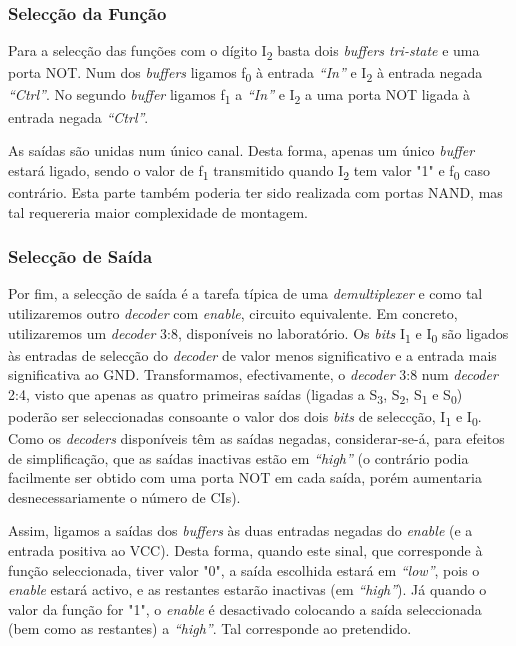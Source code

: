 \documentclass[a4paper,12pt]{article}
\begin{document}
\subsubsection{Selecção da Função}
Para a selecção das funções com o dígito I\textsubscript{2} basta dois {\it buffers tri-state} e uma porta NOT. Num dos {\it buffers} ligamos f\textsubscript{0} à entrada {\it ``In''} e I\textsubscript{2} à entrada negada {\it ``Ctrl''}. No segundo {\it buffer} ligamos f\textsubscript{1} a {\it ``In''} e I\textsubscript{2} a uma porta NOT ligada à entrada negada {\it ``Ctrl''}. 
\par
As saídas são unidas num único canal. Desta forma, apenas um único {\it buffer} estará ligado, sendo o valor de f\textsubscript{1} transmitido quando I\textsubscript{2} tem valor "1" e f\textsubscript{0} caso contrário. Esta parte também poderia ter sido realizada com portas NAND, mas tal requereria maior complexidade de montagem.
\par
\subsubsection{Selecção de Saída}
Por fim, a selecção de saída é a tarefa típica de uma {\it demultiplexer} e como tal utilizaremos outro {\it decoder} com {\it enable}, circuito equivalente. Em concreto, utilizaremos um {\it decoder} 3:8, disponíveis no laboratório. Os {\it bits} I\textsubscript{1} e I\textsubscript{0} são ligados às entradas de selecção do {\it decoder} de valor menos significativo e a entrada mais significativa ao GND. Transformamos, efectivamente, o {\it decoder} 3:8 num {\it decoder} 2:4, visto que apenas as quatro primeiras saídas (ligadas a S\textsubscript{3}, S\textsubscript{2}, S\textsubscript{1} e S\textsubscript{0}) poderão ser seleccionadas consoante o valor dos dois {\it bits} de seleccção, I\textsubscript{1} e I\textsubscript{0}. Como os {\it decoders} disponíveis têm as saídas negadas, considerar-se-á, para efeitos de simplificação, que as saídas inactivas estão em {\it ``high''} (o contrário podia facilmente ser obtido com uma porta NOT em cada saída, porém aumentaria desnecessariamente o número de CIs). 
\par
Assim, ligamos a saídas dos {\it buffers} às duas entradas negadas do {\it enable} (e a entrada positiva ao VCC). Desta forma, quando este sinal, que corresponde à função seleccionada, tiver valor "0", a saída escolhida estará em {\it ``low''}, pois o {\it enable} estará activo, e as restantes estarão inactivas (em {\it ``high''}). Já quando o valor da função for "1", o {\it enable} é desactivado colocando a saída seleccionada (bem como as restantes) a {\it ``high''}. Tal corresponde ao pretendido.
\end{document}
